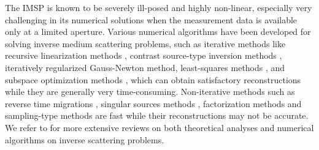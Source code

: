 \documentclass{article}
\begin{document}
The IMSP is known to be severely ill-posed and highly non-linear, especially very challenging in its numerical solutions 
when the measurement data is available only at a limited aperture. Various numerical algorithms have been developed for solving inverse medium scattering problems, 
such as iterative methods like recursive linearization methods \cite{bao2015inverse}, contrast source-type inversion methods \cite{van1997contrast,van2021forward}, iteratively regularized Gauss-Newton method\cite{langer2010investigation}, least-squares methods \cite{ito2022least}, and subspace optimization methods \cite{chen2009subspace}, which can obtain satisfactory reconstructions while they are generally very time-consuming. Non-iterative methods such as reverse time migrations \cite{chen2013reverse}, singular sources methods \cite{potthast2005singular}, factorization methods \cite{kirsch2002music,qu2019locating} and sampling-type methods \cite{cheney2001linear,cakoni2011linear,potthast2006survey,harris2020orthogonality,ito2012direct} are fast 
while their reconstructions may not be accurate. We refer to \cite{colton1998inverse, cakoni2014qualitative, xudong_book_2018} 
for more extensive reviews on both theoretical analyses and numerical algorithms on inverse scattering problems.
	
\end{document}
